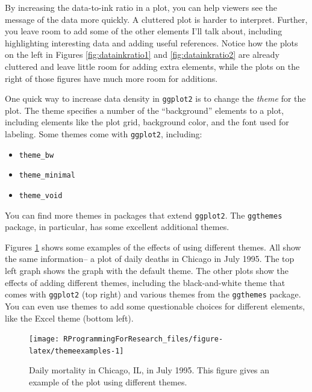 \documentclass[]{book}
\providecommand{\tightlist}{%
  \setlength{\itemsep}{0pt}\setlength{\parskip}{0pt}}
\theoremstyle{definition}
\theoremstyle{definition}
\theoremstyle{definition}
\theoremstyle{remark}
\begin{document}
By increasing the data-to-ink ratio in a plot, you can help viewers see
the message of the data more quickly. A cluttered plot is harder to
interpret. Further, you leave room to add some of the other elements
I'll talk about, including highlighting interesting data and adding
useful references. Notice how the plots on the left in Figures
\ref{fig:datainkratio1} and \ref{fig:datainkratio2} are already
cluttered and leave little room for adding extra elements, while the
plots on the right of those figures have much more room for additions.

One quick way to increase data density in \texttt{ggplot2} is to change
the \emph{theme} for the plot. The theme specifies a number of the
``background'' elements to a plot, including elements like the plot
grid, background color, and the font used for labeling. Some themes come
with \texttt{ggplot2}, including:

\begin{itemize}
\tightlist
\item
  \texttt{theme\_bw}
\item
  \texttt{theme\_minimal}
\item
  \texttt{theme\_void}
\end{itemize}

You can find more themes in packages that extend \texttt{ggplot2}. The
\texttt{ggthemes} package, in particular, has some excellent additional
themes.

Figures \ref{fig:themeexamples} shows some examples of the effects of
using different themes. All show the same information-- a plot of daily
deaths in Chicago in July 1995. The top left graph shows the graph with
the default theme. The other plots show the effects of adding different
themes, including the black-and-white theme that comes with
\texttt{ggplot2} (top right) and various themes from the
\texttt{ggthemes} package. You can even use themes to add some
questionable choices for different elements, like the Excel theme
(bottom left).

\begin{figure}

{\centering \texttt{[image: RProgrammingForResearch\_files/figure-latex/themeexamples-1]} 

}

\caption{Daily mortality in Chicago, IL, in July 1995. This figure gives an example of the plot using different themes.}\label{fig:themeexamples}
\end{figure}
\end{document}
